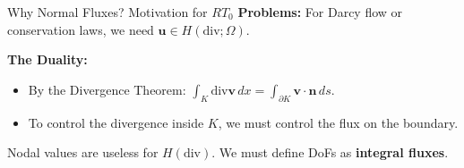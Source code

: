 \documentclass[aspectratio=169]{beamer}
\begin{document}
\begin{frame}{Why Normal Fluxes? Motivation for $RT_0$}
    \textbf{Problems:} For Darcy flow or conservation laws, we need $\bm{u} \in H(\text{div}; \Omega)$.

    \vspace{0.2cm}

    \vspace{0.2cm}
    \textbf{The Duality:}
    \begin{itemize}
        \item By the Divergence Theorem: $\int_K \text{div} \bm{v} \, dx = \int_{\partial K} \bm{v} \cdot \bm{n} \, ds$.
        \item To control the divergence inside $K$, we must control the flux on the boundary.
    \end{itemize}

    \begin{center}
    \end{center}
    Nodal values are useless for $H(\text{div})$. We must define DoFs as \textbf{integral fluxes}.
\end{frame}
\end{document}
